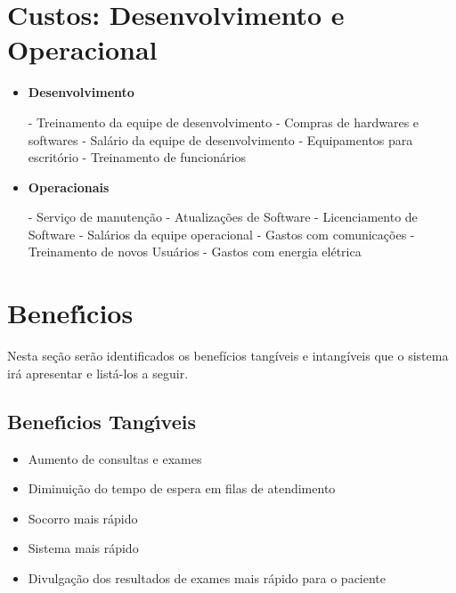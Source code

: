 \section{Custos: Desenvolvimento e Operacional}
\begin{itemize}

\item  \textbf{Desenvolvimento}

\subitem - Treinamento da equipe de  desenvolvimento
\subitem - Compras de hardwares e softwares
\subitem - Salário da equipe de desenvolvimento
\subitem - Equipamentos para escritório
\subitem - Treinamento de funcionários




\item  \textbf{Operacionais}

\subitem - Serviço de manutenção
\subitem - Atualizações de Software
\subitem - Licenciamento de Software 
\subitem - Salários da equipe operacional
\subitem - Gastos com comunicações 
\subitem - Treinamento de novos Usuários
\subitem - Gastos com energia elétrica
\end{itemize}

\section{Benef\'{\i}cios}
Nesta seção serão identificados os benefícios tangíveis e intangíveis que o sistema irá apresentar e listá-los a seguir.
       \subsection{Benef\'{\i}cios Tang\'{\i}veis}
       
       \begin{itemize}
       \item  Aumento de consultas e exames
       \item  Diminuição do tempo de espera em filas de atendimento
       \item  Socorro mais rápido
       \item  Sistema mais rápido
       \item   Divulgação dos resultados de exames mais rápido para o paciente
       \end{itemize}

